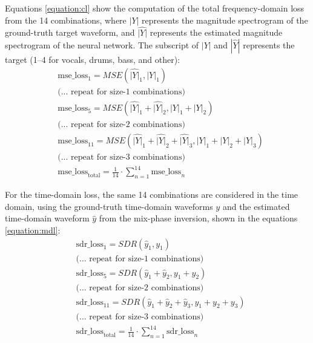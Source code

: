 \documentclass[report.tex]{subfiles}
\begin{document}
Equations \eqref{equation:cl} show the computation of the total frequency-domain loss from the 14 combinations, where $|Y|$ represents the magnitude spectrogram of the ground-truth target waveform, and $\hat{|Y|}$ represents the estimated magnitude spectrogram of the neural network. The subscript of $|Y|$ and $|\hat{Y}|$ represents the target (1--4 for vocals, drums, bass, and other):
\begin{align}\tag{34}\label{equation:cl}
	\nonumber & \text{mse\_loss}_{1} = \mathit{MSE}(\hat{|Y|}_{1}, |Y|_{1})\\
	\nonumber & \text{(... repeat for size-1 combinations)}\\
	\nonumber & \text{mse\_loss}_{5} = \mathit{MSE}(\hat{|Y|}_{1} + \hat{|Y|}_{2}, |Y|_{1} + |Y|_{2})\\
	\nonumber & \text{(... repeat for size-2 combinations)}\\
	\nonumber & \text{mse\_loss}_{11} = \mathit{MSE}(\hat{|Y|}_{1} + \hat{|Y|}_{2} + \hat{|Y|}_{3}, |Y|_{1} + |Y|_{2} + |Y|_{3})\\
	\nonumber & \text{(... repeat for size-3 combinations)}\\
	\nonumber & \text{mse\_loss}_{\text{total}} = \frac{1}{14} \cdot \sum_{n = 1}^{14}{\text{mse\_loss}_{n}}
\end{align}

For the time-domain loss, the same 14 combinations are considered in the time domain, using the ground-truth time-domain waveforms $y$ and the estimated time-domain waveform $\hat{y}$ from the mix-phase inversion, shown in the equations \eqref{equation:mdl}:
\begin{align}\tag{35}\label{equation:mdl}
	\nonumber & \text{sdr\_loss}_{1} = \mathit{SDR}(\hat{y}_{1}, y_{1})\\
	\nonumber & \text{(... repeat for size-1 combinations)}\\
	\nonumber & \text{sdr\_loss}_{5} = \mathit{SDR}(\hat{y}_{1} + \hat{y}_{2}, y_{1} + y_{2})\\
	\nonumber & \text{(... repeat for size-2 combinations)}\\
	\nonumber & \text{sdr\_loss}_{11} = \mathit{SDR}(\hat{y}_{1} + \hat{y}_{2} + \hat{y}_{3}, y_{1} + y_{2} + y_{3})\\
	\nonumber & \text{(... repeat for size-3 combinations)}\\
	\nonumber & \text{sdr\_loss}_{\text{total}} = \frac{1}{14} \cdot \sum_{n = 1}^{14}{\text{sdr\_loss}_{n}}
\end{align}
\end{document}
